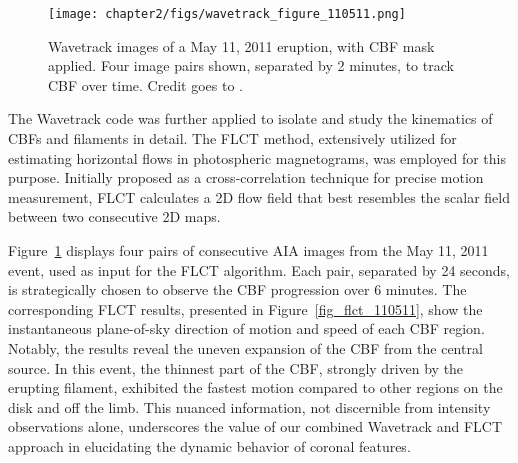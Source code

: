 \begin{figure}[!htp]
	\centering
	\texttt{[image: chapter2/figs/wavetrack\_figure\_110511.png]}
	\caption{Wavetrack images of a May 11, 2011 eruption, with CBF mask applied. Four image pairs shown, separated by 2 minutes, to track CBF over time. Credit goes to \citet{stepanyuk_2022}.}
	\label{fig_wavetrack_cbf_center}
\end{figure}

The Wavetrack code was further applied to isolate and study the kinematics of CBFs and filaments in detail. The FLCT method, extensively utilized for estimating horizontal flows in photospheric magnetograms, was employed for this purpose. Initially proposed as a cross-correlation technique for precise motion measurement, FLCT calculates a 2D flow field that best resembles the scalar field between two consecutive 2D maps.

Figure~\ref{fig_wavetrack_cbf_center} displays four pairs of consecutive AIA images from the May 11, 2011 event, used as input for the FLCT algorithm. Each pair, separated by 24 seconds, is strategically chosen to observe the CBF progression over 6 minutes. The corresponding FLCT results, presented in Figure~\ref{fig_flct_110511}, show the instantaneous plane-of-sky direction of motion and speed of each CBF region. Notably, the results reveal the uneven expansion of the CBF from the central source. In this event, the thinnest part of the CBF, strongly driven by the erupting filament, exhibited the fastest motion compared to other regions on the disk and off the limb. This nuanced information, not discernible from intensity observations alone, underscores the value of our combined Wavetrack and FLCT approach in elucidating the dynamic behavior of coronal features.

